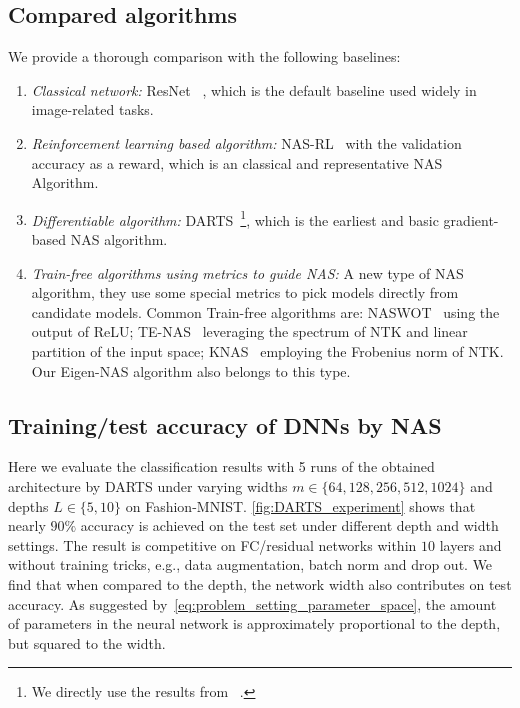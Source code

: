 \documentclass[nohyperref]{article}
\theoremstyle{plain}
\theoremstyle{definition}
\theoremstyle{remark}
\begin{document}
\subsection{Compared algorithms}

We provide a thorough comparison with the following baselines: 

\begin{enumerate}[leftmargin=3.3mm]
    \itemsep-0.2em 
    \item \textit{Classical network:} ResNet ~\citep{7780459}, which is the default baseline used widely in image-related tasks. 
    \item \textit{Reinforcement learning based algorithm:} NAS-RL~\citep{45826} with the validation accuracy as a reward, which is an classical and representative NAS Algorithm.
    \item \textit{Differentiable algorithm:} DARTS~\citep{liu2019darts}\footnote{We directly use the results from ~\citet{pmlr-v139-xu21m}.}, which is the earliest and basic gradient-based NAS algorithm.
    \item \textit{Train-free algorithms using metrics to guide NAS:} A new type of NAS algorithm, they use some special metrics to pick models directly from candidate models. Common Train-free algorithms are: NASWOT~\citep{mellor2021neural} using the output of ReLU; TE-NAS~\citep{chen2021neural} leveraging the spectrum of NTK and linear partition of the input space; KNAS~\citep{pmlr-v139-xu21m} employing the Frobenius norm of NTK. Our Eigen-NAS algorithm also belongs to this type.
\end{enumerate}




\subsection{Training/test accuracy of DNNs by NAS}

Here we evaluate the classification results with 5 runs of the obtained architecture by DARTS under varying widths $m\in \{64, 128, 256, 512, 1024\}$ and depths $L \in \{5, 10\}$ on Fashion-MNIST.
\cref{fig:DARTS_experiment} shows that nearly $90\%$ accuracy is achieved on the test set under different depth and width settings.
The result is competitive on FC/residual networks within $10$ layers and without training tricks, e.g., data augmentation, batch norm and drop out. 
We find that when compared to the depth, the network width also contributes on test accuracy. As suggested by~\cref{eq:problem_setting_parameter_space}, the amount of parameters in the neural network is approximately proportional to the depth, but squared to the width. 
\end{document}
